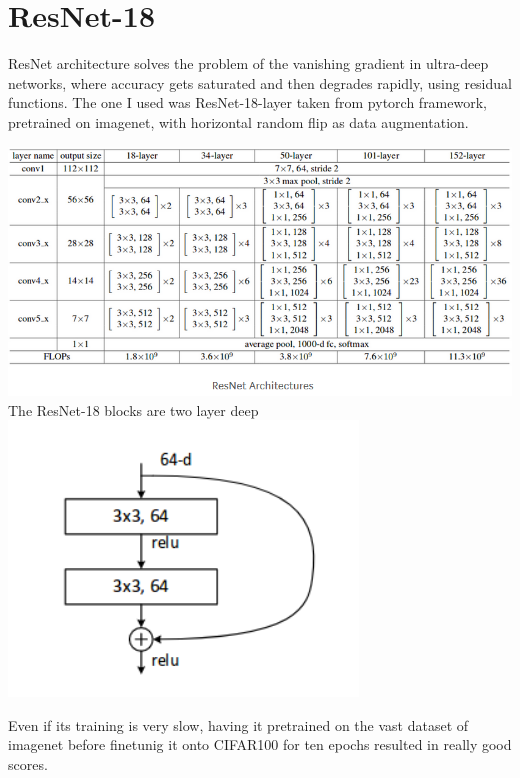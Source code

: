\documentclass[11pt]{article}
\makeatletter
\def\maxwidth{\ifdim\Gin@nat@width>\linewidth\linewidth
  \else\Gin@nat@width\fi}
\let\Oldincludegraphics\includegraphics
\renewcommand{\includegraphics}[1]{\Oldincludegraphics[width=.8\maxwidth]{#1}}
\makeatother
\begin{document}
\section{ResNet-18}\label{resNet}\hypertarget{resNet}{}
ResNet architecture solves the problem of the vanishing gradient in ultra-deep networks, where accuracy gets saturated and then degrades rapidly, using residual functions. \newline
The one I used was ResNet-18-layer taken from pytorch framework, pretrained on imagenet, with horizontal random flip as data augmentation. \newline
\begin{center}
  \includegraphics{3_class.png} \newline
  The ResNet-18 blocks are two layer deep \newline
  \includegraphics{3_class2.png} \newline
\end{center}
Even if its training is very slow, having it pretrained on the vast dataset of imagenet before finetunig it onto CIFAR100 for ten epochs resulted in really good scores. \newline
\end{document}
